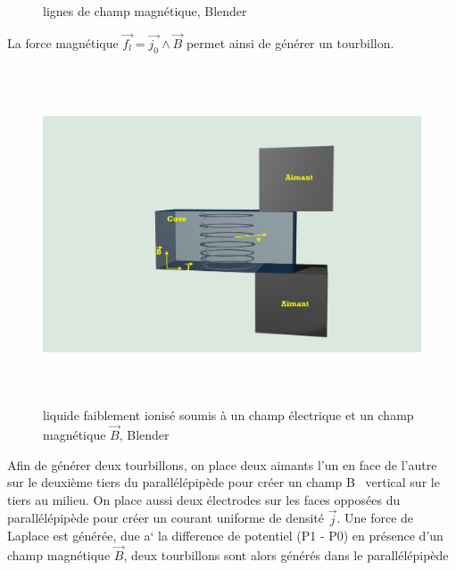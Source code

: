 \documentclass[a4paper,12pt,titlepage]{report}
\begin{document}
\begin{onehalfspace}
\begin{figure}[!h]
\begin{center}
		\caption{lignes de champ magnétique, Blender}
	\end{center}
\end{figure}
\newpage
La force magnétique $\vec{f_l}=\vec{j_0}\land\vec{B}$ permet ainsi de générer un tourbillon.\newline
\begin{figure}[h]
	\begin{center}
	\centering	
		\includegraphics[height = 10cm, keepaspectratio]{graphes/blender_cuve_champvec2.png}
		\caption{liquide faiblement ionisé soumis à un champ électrique et un champ magnétique $\vec{B}$, Blender}
	\end{center}
\end{figure}
Afin de générer deux tourbillons, on place deux aimants l'un en face de l’autre sur le deuxième tiers du parallélépipède pour créer un champ B~ vertical sur le tiers au milieu.
On place aussi deux électrodes sur les faces opposées du parallélépipède pour créer un courant uniforme de densité $\vec{j}$.
Une force de Laplace est générée, due a` la difference de potentiel (P1 - P0) en présence d’un champ magnétique $\vec{B}$, deux tourbillons sont alors générés dans le parallélépipède



\end{onehalfspace}
\end{document}
